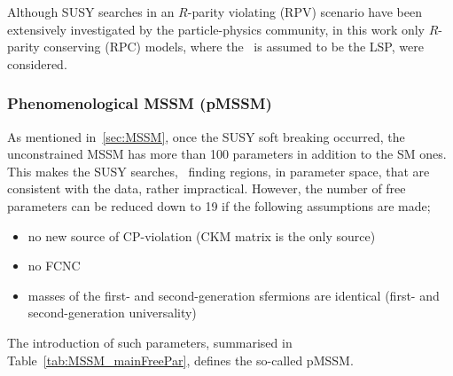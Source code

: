 				Although \ac{SUSY} searches in an $R$-parity violating (RPV) scenario have been extensively investigated by the particle-physics community, in this work only $R$-parity conserving (RPC) models, where the \ninoone\ is assumed to be the \ac{LSP}, were considered.

			\subsubsection*{Phenomenological \ac{MSSM} (pMSSM)}

				As mentioned in~\ref{sec:MSSM}, once the \ac{SUSY} soft breaking occurred, the unconstrained \ac{MSSM} has more than 100 parameters in addition to the \ac{SM} ones. This makes the \ac{SUSY} searches, \eg\ finding regions, in parameter space, that are consistent with the data, rather impractical. However, the number of free parameters can be reduced down to 19 if the following  assumptions are made; 

				\begin{itemize}
					\item no new source of CP-violation (CKM matrix is the only source)
					\item no \ac{FCNC}
					\item masses of the first- and second-generation sfermions are identical (first- and second-generation universality)
				\end{itemize}
				
				\noindent The introduction of such parameters, summarised in Table~\ref{tab:MSSM_mainFreePar}, defines the so-called \ac{pMSSM}.
				
